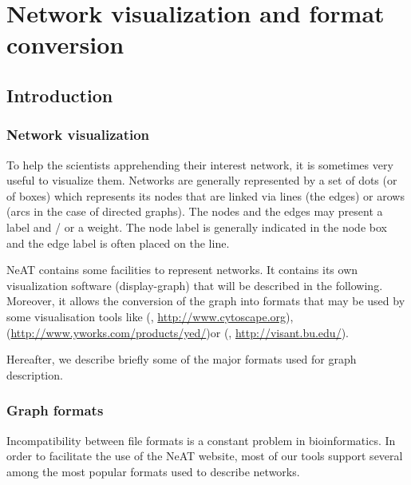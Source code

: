 \chapter{Network visualization and format conversion}

\section{Introduction}

\subsection{Network visualization}
To help the scientists apprehending their interest network, it is sometimes very useful to visualize them. Networks are generally represented by a set of dots (or of boxes) which represents its nodes that are linked via lines (the edges) or arows (arcs in the case of directed graphs). The nodes and the edges may present a label and / or a weight. The node label is generally indicated in the node box and the edge label is often placed on the line.

NeAT contains some facilities to represent networks. It contains its own visualization software (display-graph) that will be described in the following. Moreover, it allows the conversion of the graph into formats that may be used 
by some visualisation tools like  (\cite{Shannon2003}, \url{http://www.cytoscape.org}),  (\url{http://www.yworks.com/products/yed/})or  (\cite{Hu2007}, \url{http://visant.bu.edu/}).

Hereafter, we describe briefly some of the major formats used for graph description.

\subsection{Graph formats}

Incompatibility between file formats is a constant problem in bioinformatics. In order to facilitate the use of the NeAT website, most of our tools support several among the most popular formats used to describe networks. 


